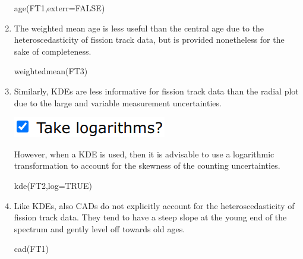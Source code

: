 \begin{refsection}
\begin{enumerate}
\begin{console}
age(FT1,exterr=FALSE)
\end{console}

\item The weighted mean age is less useful than the central age due to
  the heteroscedasticity of fission track data, but is provided
  nonetheless for the sake of completeness.

\begin{console}
weightedmean(FT3)
\end{console}

\item Similarly, KDEs are less informative for fission track data than the
  radial plot due to the large and variable measurement uncertainties.

\noindent\begin{minipage}[t]{.2\linewidth}
\strut\vspace*{-\baselineskip}\newline
\includegraphics[width=\linewidth]{../figures/UPbKDElogarithm.png}
\end{minipage}
\begin{minipage}[t]{.8\linewidth}
  However, when a KDE is used, then it is advisable to use a
  logarithmic transformation to account for the skewness of the
  counting uncertainties.
\end{minipage}

\begin{console}
kde(FT2,log=TRUE)
\end{console}

\item Like KDEs, also CADs do not explicitly account for the
  heteroscedasticity of fission track data. They tend to have a steep
  slope at the young end of the spectrum and gently level off towards
  old ages.

\begin{console}
cad(FT1)
\end{console}
  
\end{enumerate}

\printbibliography[heading=subbibliography]

\end{refsection}
